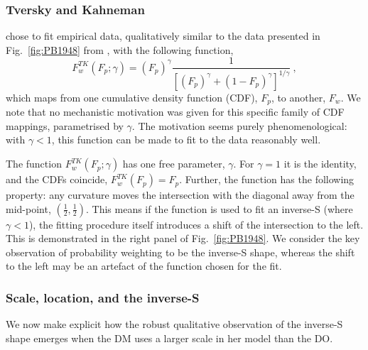 \documentclass[12pt,letter,timesnewroman]{article}
\newcommand{\elabel}[1]{\label{eq:#1}}
\newcommand{\eref}[1]{(Eq.~\ref{eq:#1})}
\newcommand{\fref}[1]{Fig.~\ref{fig:#1}}
\newcommand{\be}{\begin{equation}}
\newcommand{\ee}{\end{equation}}
\renewcommand{\AA}[1]{{\it ***AA: #1 AA***}}
\begin{document}
\subsubsection*{Tversky and Kahneman}
\textcite{TverskyKahneman1992} chose to fit empirical data, qualitatively similar to the data presented in \fref{PB1948} from \textcite{PrestonBaratta1948}, with the following function,
%
\be
\elabel{correspondence}
F^{TK}_w\left(F_p; \gamma\right) = \left(F_p\right)^\gamma \frac{1}{\left[\left(F_p\right)^\gamma+\left(1-F_p\right)^\gamma\right]^{1/\gamma}} ~,
\ee
%
which maps from one cumulative density function (CDF), $F_p$, to another, $F_w$. We note that no mechanistic motivation was given for this specific family of CDF mappings, parametrised by $\gamma$. The motivation seems purely phenomenological: with $\gamma<1$, this function can be made to fit to the data reasonably well.

The function $F^{TK}_w\left(F_p; \gamma \right)$ has one free parameter, $\gamma$. For $\gamma=1$ it is the identity, and the CDFs coincide, $F^{TK}_w\left(F_p\right)=F_p$. Further, the function has the following property: any curvature moves the intersection with the diagonal away from the mid-point, $(\tfrac{1}{2},\tfrac{1}{2})$. This means if the function is used to fit an inverse-S (where $\gamma<1$), the fitting procedure itself introduces a shift of the intersection to the left. This is demonstrated in the right panel of \fref{PB1948}. We consider the key observation of probability weighting to be the inverse-S shape, whereas the shift to the left may be an artefact of the function chosen for the fit.


\subsubsection*{Scale, location, and the inverse-S}
We now make explicit how the robust qualitative observation of the inverse-S shape emerges when the DM uses a larger scale in her model than the DO.
\end{document}
